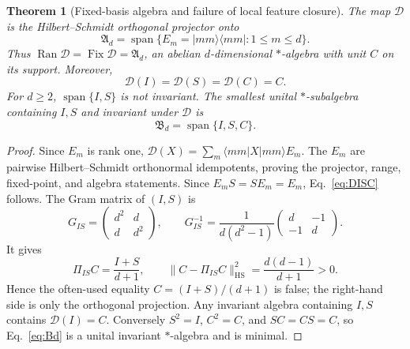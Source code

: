 \documentclass[aps,prx,reprint,superscriptaddress,nobibnotes,longbibliography]{revtex4-2}
\newtheorem{theorem}{Theorem}
\theoremstyle{remark}
\newcommand{\Ran}{\operatorname{Ran}}
\newcommand{\Fix}{\operatorname{Fix}}
\newcommand{\HS}{\mathrm{HS}}
\begin{document}
\begin{theorem}[Fixed-basis algebra and failure of local feature closure]
\label{thm:fixed-algebra}
The map $\mathcal D$ is the Hilbert--Schmidt orthogonal projector onto
\begin{equation}
 \mathfrak A_d=\operatorname{span}\{E_m=|mm\rangle\langle mm|:1\le m\le d\}.
\end{equation}
Thus $\Ran\mathcal D=\Fix\mathcal D=\mathfrak A_d$, an abelian $d$-dimensional $*$-algebra with unit $C$ on its support.  Moreover,
\begin{equation}
 \mathcal D(I)=\mathcal D(S)=\mathcal D(C)=C.
 \label{eq:DISC}
\end{equation}
For $d\ge2$, $\operatorname{span}\{I,S\}$ is not invariant.  The smallest unital $*$-subalgebra containing $I,S$ and invariant under $\mathcal D$ is
\begin{equation}
 \mathfrak B_d=\operatorname{span}\{I,S,C\}.
 \label{eq:Bd}
\end{equation}
\end{theorem}

\begin{proof}
Since $E_m$ is rank one,
$\mathcal D(X)=\sum_m\langle mm|X|mm\rangle E_m$.
The $E_m$ are pairwise Hilbert--Schmidt orthonormal idempotents, proving the projector, range, fixed-point, and algebra statements.  Since $E_mS=SE_m=E_m$, Eq.~\eqref{eq:DISC} follows.  The Gram matrix of $(I,S)$ is
\begin{equation}
 G_{IS}=\begin{pmatrix}d^2&d\\d&d^2\end{pmatrix},\qquad
 G_{IS}^{-1}=\frac1{d(d^2-1)}\begin{pmatrix}d&-1\\-1&d\end{pmatrix}.
\end{equation}
It gives
\begin{equation}
 \Pi_{IS}C=\frac{I+S}{d+1},\qquad
 \|C-\Pi_{IS}C\|_{\HS}^2=\frac{d(d-1)}{d+1}>0.
 \label{eq:leaknorm}
\end{equation}
Hence the often-used equality $C=(I+S)/(d+1)$ is false; the right-hand side is only the orthogonal projection.  Any invariant algebra containing $I,S$ contains $\mathcal D(I)=C$.  Conversely $S^2=I$, $C^2=C$, and $SC=CS=C$, so Eq.~\eqref{eq:Bd} is a unital invariant $*$-algebra and is minimal.
\end{proof}
\end{document}

